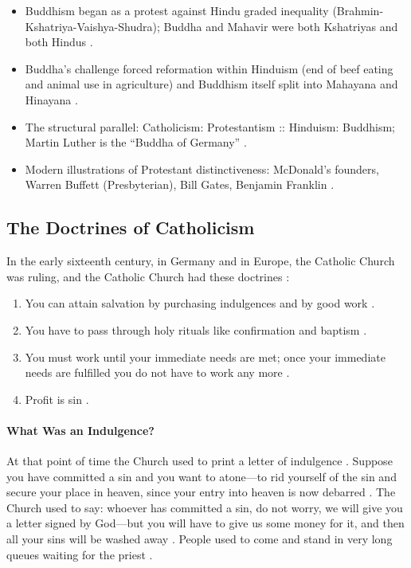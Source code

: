 \begin{QuickRevision}
\begin{itemize}
    \item Buddhism began as a protest against Hindu graded inequality (Brahmin-Kshatriya-Vaishya-Shudra); Buddha and Mahavir were both Kshatriyas and both Hindus .
    \item Buddha's challenge forced reformation within Hinduism (end of beef eating and animal use in agriculture) and Buddhism itself split into Mahayana and Hinayana .
    \item The structural parallel: Catholicism: Protestantism :: Hinduism: Buddhism; Martin Luther is the ``Buddha of Germany'' .
    \item Modern illustrations of Protestant distinctiveness: McDonald's founders, Warren Buffett (Presbyterian), Bill Gates, Benjamin Franklin .
\end{itemize}
\end{QuickRevision}

\subsection{The Doctrines of Catholicism}
In the early sixteenth century, in Germany and in Europe, the Catholic Church was ruling, and the Catholic Church had these doctrines :
\begin{enumerate}
    \item You can attain salvation by purchasing indulgences and by good work .
    \item You have to pass through holy rituals like confirmation and baptism .
    \item You must work until your immediate needs are met; once your immediate needs are fulfilled you do not have to work any more .
    \item Profit is sin .
\end{enumerate}

\paragraph{What Was an Indulgence?}
\begin{ExampleBox}
At that point of time the Church used to print a letter of indulgence . Suppose you have committed a sin and you want to atone---to rid yourself of the sin and secure your place in heaven, since your entry into heaven is now debarred .
The Church used to say: whoever has committed a sin, do not worry, we will give you a letter signed by God---but you will have to give us some money for it, and then all your sins will be washed away .
People used to come and stand in very long queues waiting for the priest .
\end{ExampleBox}

